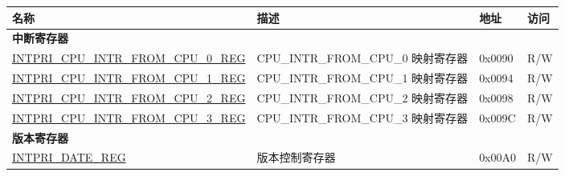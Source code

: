 \begin{longtable}{ | p{6cm} | p{7.2cm} | p{1.3cm} | p{1cm} | }
\hline\rowcolor{lightgray}
名称 & 描述 &  地址 & 访问 \\ \hline
\endhead
\multicolumn{4}{|l|}{\textbf{中断寄存器}} \\ \hline
\hyperref[regdesc:INTPRICPUINTRFROMCPUNREG]{INTPRI\_CPU\_INTR\_FROM\_CPU\_0\_REG} & CPU\_INTR\_FROM\_CPU\_0 映射寄存器 & 0x0090 & R/W \\ \hline
\hyperref[regdesc:INTPRICPUINTRFROMCPUNREG]{INTPRI\_CPU\_INTR\_FROM\_CPU\_1\_REG} & CPU\_INTR\_FROM\_CPU\_1 映射寄存器 & 0x0094 & R/W \\ \hline
\hyperref[regdesc:INTPRICPUINTRFROMCPUNREG]{INTPRI\_CPU\_INTR\_FROM\_CPU\_2\_REG} & CPU\_INTR\_FROM\_CPU\_2 映射寄存器 & 0x0098 & R/W \\ \hline
\hyperref[regdesc:INTPRICPUINTRFROMCPUNREG]{INTPRI\_CPU\_INTR\_FROM\_CPU\_3\_REG} & CPU\_INTR\_FROM\_CPU\_3 映射寄存器 & 0x009C & R/W \\ \hline
\multicolumn{4}{|l|}{\textbf{版本寄存器}} \\ \hline
\hyperref[regdesc:INTPRIDATEREG]{INTPRI\_DATE\_REG} & 版本控制寄存器 & 0x00A0 & R/W \\ \hline
\end{longtable}
